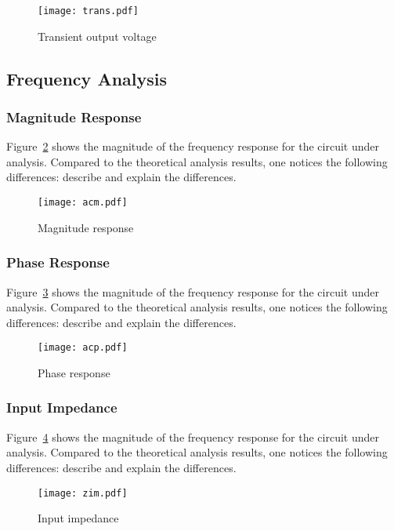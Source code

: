 \begin{figure}[h] \centering
\texttt{[image: trans.pdf]}
\caption{Transient output voltage}
\label{fig:trans}
\end{figure}

\lipsum[1-1]



\subsection{Frequency Analysis}

\subsubsection{Magnitude Response}

Figure~\ref{fig:acm} shows the magnitude of the frequency response for the
circuit under analysis. Compared to the theoretical analysis results, one
notices the following differences: describe and explain the differences.

\begin{figure}[h] \centering
\texttt{[image: acm.pdf]}
\caption{Magnitude response}
\label{fig:acm}
\end{figure}

\lipsum[1-1]

\subsubsection{Phase Response}

Figure~\ref{fig:acp} shows the magnitude of the frequency response for the
circuit under analysis. Compared to the theoretical analysis results, one
notices the following differences: describe and explain the differences.

\begin{figure}[h] \centering
\texttt{[image: acp.pdf]}
\caption{Phase response}
\label{fig:acp}
\end{figure}

\lipsum[1-1]

\subsubsection{Input Impedance}

Figure~\ref{fig:zim} shows the magnitude of the frequency response for the
circuit under analysis. Compared to the theoretical analysis results, one
notices the following differences: describe and explain the differences.

\begin{figure}[h] \centering
\texttt{[image: zim.pdf]}
\caption{Input impedance}
\label{fig:zim}
\end{figure}

\lipsum[1-1]



